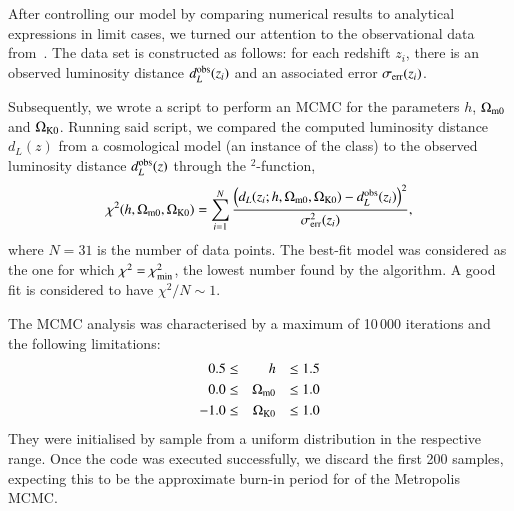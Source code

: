 After controlling our model by comparing numerical results to analytical expressions in limit cases, we turned our attention to the observational data from~\citet{supernovadata}. The data set is constructed as follows: for each redshift $z_i$, there is an observed luminosity distance $d_L^\mathrm{obs}(z_i)$ and an associated error $\sigma_\mathrm{err}(z_i)$. %

Subsequently, we wrote a script to perform an MCMC for the parameters $h$, $\Omega_{\mathrm{m}0}$ and $\Omega_{\mathrm{K}0}$. Running said script, we compared the computed luminosity distance $d_L(z)$ from a cosmological model (an instance of the class) to the observed luminosity distance $d_L^\mathrm{obs}(z)$ through the \textchi$^2$-function,
\begin{equation}
    \chi^2(h, \Omega_{\mathrm{m}0}, \Omega_{\mathrm{K}0}) = \sum_{i=1}^N \frac{ \left( d_L(z_i; h, \Omega_{\mathrm{m}0}, \Omega_{\mathrm{K}0}) - d_L^\mathrm{obs}(z_i)\right)^2 }{\sigma_\mathrm{err}^2(z_i)},
\end{equation}
where $N=31$ is the number of data points. The best-fit model was considered as the one for which $\chi^2 = \chi^2_\mathrm{min}$, the lowest number found by the algorithm. A good fit is considered to have $\chi^2/N \sim 1$. 

The MCMC analysis was characterised by a maximum of 10\,000 iterations and the following limitations:
\begin{equation}\label{mil1:imp:eq:mcmc_limits}
    \begin{split}
        0.5 \leq&& h &&\leq 1.5 \\
        0.0 \leq&& \Omega_{\mathrm{m}0} &&\leq 1.0 \\
        -1.0 \leq&& \Omega_{\mathrm{K}0} &&\leq 1.0 
    \end{split}
\end{equation}
They were initialised by sample from a uniform distribution in the respective range. Once the code was executed successfully, we discard the first 200 samples, expecting this to be the approximate burn-in period for of the Metropolis MCMC.
